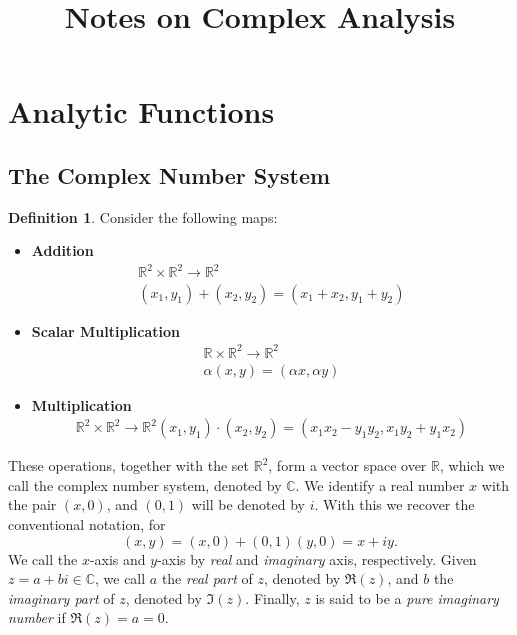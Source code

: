 \documentclass[12pt]{article}
\title{Notes on Complex Analysis}
\author{}
\newcommand{\CC}{\mathbb{C}}
\newcommand{\RR}{\mathbb{R}}
\theoremstyle{definition}
\newtheorem{definition}{Definition}[section]
\begin{document}
\maketitle
\tableofcontents
\newpage
\section{Analytic Functions}
\subsection{The Complex Number System}
\begin{definition}
Consider the following maps:
\begin{itemize}
	\item
		\textbf{Addition}
		\begin{gather*}
			\RR^2 \times \RR^2 \to \RR^2 \\
			(x_1, y_1) + (x_2, y_2) = (x_1 + x_2, y_1 + y_2)
		\end{gather*} 
	\item
		\textbf{Scalar Multiplication}
		\begin{gather*}
			\RR \times \RR^2 \to \RR^2 \\
			\alpha (x, y) = (\alpha x, \alpha y)
		\end{gather*}
	\item
		\textbf{Multiplication}
		\begin{gather*}
			\RR^2 \times \RR^2 \to \RR^2	
			(x_1, y_1) \cdot (x_2, y_2) = (x_1 x_2 - y_1 y_2, x_1 y_2 + y_1 x_2)
		\end{gather*}
\end{itemize}
These operations, together with the set $\RR^2$, form a vector space over $\RR$, which we call the complex number system, denoted by $\CC$. We identify a real number $x$ with the pair $(x,0)$, and $(0,1)$ will be denoted by $i$. With this we recover the conventional notation, for 
\[
	(x,y) = (x,0) + (0,1)(y,0) = x + iy.
\]
We call the $x$-axis and $y$-axis by \emph{real} and \emph{imaginary} axis, respectively. Given $z = a+bi \in \CC$, we call $a$ the \emph{real part} of $z$, denoted by $\Re(z)$, and $b$ the \emph{imaginary part} of $z$, denoted by $\Im(z)$. Finally, $z$ is said to be a \emph{pure imaginary number} if $\Re(z) = a = 0$. 
\end{definition}
\end{document}
